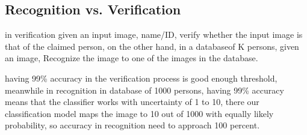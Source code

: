 \documentclass[4apaper,12pt]{book}
\begin{document}
  \subsection{Recognition vs. Verification}
  \begin{description}
  \item in verification given an input image, name/ID, verify whether the input image is that of the claimed person, on the other hand, in a databaseof K persons, given an image, Recognize the image to one of the images in the database.
  \item having 99\% accuracy in the verification process is good enough threshold, meanwhile in recognition in database of 1000 persons, having 99\% accuracy means that the classifier works with uncertainty  of 1 to 10, there our classification model maps the image to 10 out of 1000 with equally likely probability, so accuracy in recognition need to  approach 100 percent.
  \end{description}
\end{document}
